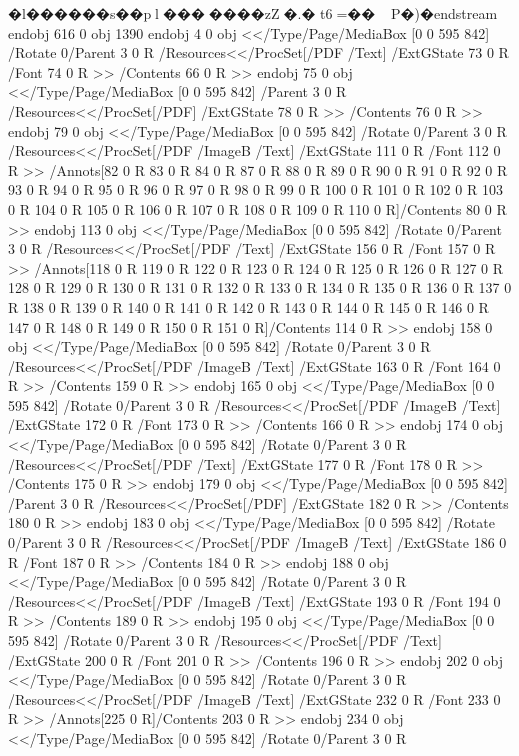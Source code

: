 {{{{{{{{{{{{{{{{{{{{{{{{{{{{�l������s��pl�������zZ�.� t6=��P�)�endstream
endobj
616 0 obj
1390
endobj
4 0 obj
<</Type/Page/MediaBox [0 0 595 842]
/Rotate 0/Parent 3 0 R
/Resources<</ProcSet[/PDF /Text]
/ExtGState 73 0 R
/Font 74 0 R
>>
/Contents 66 0 R
>>
endobj
75 0 obj
<</Type/Page/MediaBox [0 0 595 842]
/Parent 3 0 R
/Resources<</ProcSet[/PDF]
/ExtGState 78 0 R
>>
/Contents 76 0 R
>>
endobj
79 0 obj
<</Type/Page/MediaBox [0 0 595 842]
/Rotate 0/Parent 3 0 R
/Resources<</ProcSet[/PDF /ImageB /Text]
/ExtGState 111 0 R
/Font 112 0 R
>>
/Annots[82 0 R
83 0 R
84 0 R
87 0 R
88 0 R
89 0 R
90 0 R
91 0 R
92 0 R
93 0 R
94 0 R
95 0 R
96 0 R
97 0 R
98 0 R
99 0 R
100 0 R
101 0 R
102 0 R
103 0 R
104 0 R
105 0 R
106 0 R
107 0 R
108 0 R
109 0 R
110 0 R]/Contents 80 0 R
>>
endobj
113 0 obj
<</Type/Page/MediaBox [0 0 595 842]
/Rotate 0/Parent 3 0 R
/Resources<</ProcSet[/PDF /Text]
/ExtGState 156 0 R
/Font 157 0 R
>>
/Annots[118 0 R
119 0 R
122 0 R
123 0 R
124 0 R
125 0 R
126 0 R
127 0 R
128 0 R
129 0 R
130 0 R
131 0 R
132 0 R
133 0 R
134 0 R
135 0 R
136 0 R
137 0 R
138 0 R
139 0 R
140 0 R
141 0 R
142 0 R
143 0 R
144 0 R
145 0 R
146 0 R
147 0 R
148 0 R
149 0 R
150 0 R
151 0 R]/Contents 114 0 R
>>
endobj
158 0 obj
<</Type/Page/MediaBox [0 0 595 842]
/Rotate 0/Parent 3 0 R
/Resources<</ProcSet[/PDF /ImageB /Text]
/ExtGState 163 0 R
/Font 164 0 R
>>
/Contents 159 0 R
>>
endobj
165 0 obj
<</Type/Page/MediaBox [0 0 595 842]
/Rotate 0/Parent 3 0 R
/Resources<</ProcSet[/PDF /ImageB /Text]
/ExtGState 172 0 R
/Font 173 0 R
>>
/Contents 166 0 R
>>
endobj
174 0 obj
<</Type/Page/MediaBox [0 0 595 842]
/Rotate 0/Parent 3 0 R
/Resources<</ProcSet[/PDF /Text]
/ExtGState 177 0 R
/Font 178 0 R
>>
/Contents 175 0 R
>>
endobj
179 0 obj
<</Type/Page/MediaBox [0 0 595 842]
/Parent 3 0 R
/Resources<</ProcSet[/PDF]
/ExtGState 182 0 R
>>
/Contents 180 0 R
>>
endobj
183 0 obj
<</Type/Page/MediaBox [0 0 595 842]
/Rotate 0/Parent 3 0 R
/Resources<</ProcSet[/PDF /ImageB /Text]
/ExtGState 186 0 R
/Font 187 0 R
>>
/Contents 184 0 R
>>
endobj
188 0 obj
<</Type/Page/MediaBox [0 0 595 842]
/Rotate 0/Parent 3 0 R
/Resources<</ProcSet[/PDF /ImageB /Text]
/ExtGState 193 0 R
/Font 194 0 R
>>
/Contents 189 0 R
>>
endobj
195 0 obj
<</Type/Page/MediaBox [0 0 595 842]
/Rotate 0/Parent 3 0 R
/Resources<</ProcSet[/PDF /Text]
/ExtGState 200 0 R
/Font 201 0 R
>>
/Contents 196 0 R
>>
endobj
202 0 obj
<</Type/Page/MediaBox [0 0 595 842]
/Rotate 0/Parent 3 0 R
/Resources<</ProcSet[/PDF /ImageB /Text]
/ExtGState 232 0 R
/Font 233 0 R
>>
/Annots[225 0 R]/Contents 203 0 R
>>
endobj
234 0 obj
<</Type/Page/MediaBox [0 0 595 842]
/Rotate 0/Parent 3 0 R
}}}}}}}}}}}}}}}}}}}}}}}}}}}}
